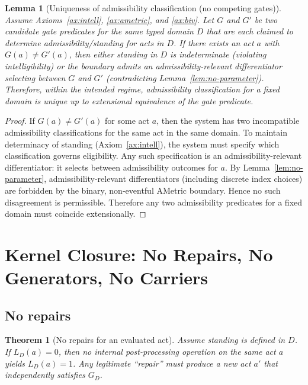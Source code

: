\documentclass[12pt]{article}
\newtheorem{lemma}{Lemma}
\newtheorem{theorem}{Theorem}
\begin{document}
\begin{lemma}[Uniqueness of admissibility classification (no competing gates)]
\label{lem:unique-gate}
Assume Axioms~\ref{ax:intell}, \ref{ax:ametric}, and \ref{ax:biv}. Let $G$ and $G'$ be two candidate gate predicates for the same typed domain $D$
that are each claimed to determine admissibility/standing for acts in $D$. If there exists an act $a$ with $G(a)\neq G'(a)$, then either
standing in $D$ is indeterminate (violating intelligibility) or the boundary admits an admissibility-relevant differentiator selecting between
$G$ and $G'$ (contradicting Lemma~\ref{lem:no-parameter}). Therefore, within the intended regime, admissibility classification for a fixed domain is
unique up to extensional equivalence of the gate predicate.
\end{lemma}

\begin{proof}
If $G(a)\neq G'(a)$ for some act $a$, then the system has two incompatible admissibility classifications for the same act in the same domain.
To maintain determinacy of standing (Axiom~\ref{ax:intell}), the system must specify which classification governs eligibility. Any such specification
is an admissibility-relevant differentiator: it selects between admissibility outcomes for $a$. By Lemma~\ref{lem:no-parameter}, admissibility-relevant
differentiators (including discrete index choices) are forbidden by the binary, non-eventful AMetric boundary. Hence no such disagreement is permissible.
Therefore any two admissibility predicates for a fixed domain must coincide extensionally.
\end{proof}


\section{Kernel Closure: No Repairs, No Generators, No Carriers}
\label{sec:kernel}

\subsection{No repairs}

\begin{theorem}[No repairs for an evaluated act]
\label{thm:no-repairs}
Assume standing is defined in $D$. If $L_D(a)=0$, then no internal post-processing operation on the \emph{same act} $a$
yields $L_D(a)=1$. Any legitimate ``repair'' must produce a new act $a'$ that independently satisfies $G_D$.
\end{theorem}
\end{document}
